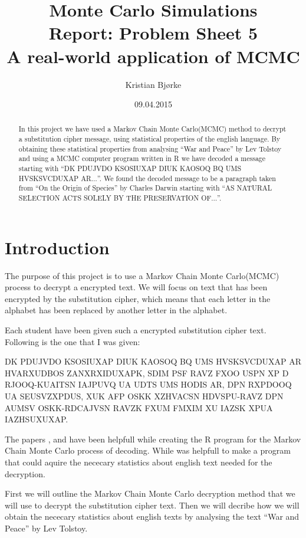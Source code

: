 \documentclass[a4paper, 11pt]{article}
\title{Monte Carlo Simulations \\
Report: Problem Sheet 5 \\ A real-world application of MCMC}
\author{Kristian Bjørke}
\date{09.04.2015}
\begin{document}
\maketitle

\begin{abstract}
  In this project we have used a Markov Chain Monte Carlo(MCMC) method to
  decrypt a substitution cipher message, using statistical properties 
  of the english language. By obtaining these statistical properties 
  from analysing ``War and Peace'' by Lev Tolstoy and using a MCMC 
  computer program written in R we have  decoded a message starting with 
  ``DK PDUJVDO KSOSIUXAP DIUK  KAOSOQ BQ UMS HVSKSVCDUXAP AR$\dots$''. 
  We found the decoded message to be a paragraph taken from ``On the 
  Origin of Species'' by Charles Darwin starting with ``AS NATURAL 
  SELECTION ACTS SOLELY BY THE PRESERVATION OF$\dots$''.
\end{abstract}

\newpage
\tableofcontents
\newpage

\section{Introduction}

The purpose of this project is to use a Markov Chain Monte Carlo(MCMC) 
process to decrypt a encrypted text. We will focus on text that has been 
encrypted by the substitution cipher, which means that each letter in 
the alphabet has been replaced by another letter in the alphabet.

Each student have been given such a encrypted substitution cipher text.
Following is the one that I was given:

\begin{adjustwidth}{1.5em}{0pt}
  \small
  DK PDUJVDO KSOSIUXAP DIUK KAOSOQ BQ UMS HVSKSVCDUXAP AR
  HVARXUDBOS ZANXRXIDUXAPK, SDIM PSF RAVZ FXOO USPN XP D RJOOQ-KUAITSN 
  IAJPUVQ UA UDTS UMS HODIS AR, DPN RXPDOOQ UA SEUSVZXPDUS, XUK
  AFP OSKK XZHVACSN HDVSPU-RAVZ DPN AUMSV OSKK-RDCAJVSN RAVZK FXUM
  FMXIM XU IAZSK XPUA IAZHSUXUXAP.
\end{adjustwidth}

The papers \cite{Diaconis}, \cite{Chen} and \cite{Kocmanek} have been helpfull
while creating the R program for the Markov Chain Monte Carlo process of
decoding. While \cite{Landgraf} was helpfull to make a program that could
aquire the nececary statistics about english text needed for the decryption.

First we will outline the Markov Chain Monte Carlo decryption method that
we will use to decrypt the substitution cipher text. Then we will decribe how
we will obtain the nececary statistics about english texts by analysing the
text ``War and Peace'' by Lev Tolstoy.
\end{document}
